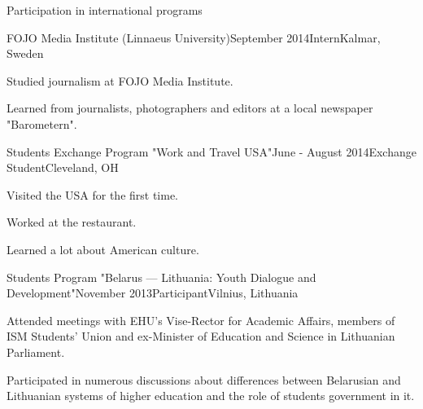 \documentclass{resume} %
\begin{document}

\begin{rSection}{Participation in international programs}
\begin{rSubsection}{FOJO Media Institute (Linnaeus University)}{September 2014}{Intern}{Kalmar, Sweden}
\item Studied journalism at FOJO Media Institute.
\item Learned from journalists, photographers and editors at a local newspaper "Barometern".
\end{rSubsection}

\begin{rSubsection}{Students Exchange Program "Work and Travel USA"}{June - August 2014}{Exchange Student}{Cleveland, OH}
\item Visited the USA for the first time.
\item Worked at the restaurant.
\item Learned a lot about American culture.
\end{rSubsection}

\begin{rSubsection}{Students Program "Belarus — Lithuania: Youth Dialogue and Development"}{November 2013}{Participant}{Vilnius, Lithuania}
\item Attended meetings with EHU's Vise-Rector for Academic Affairs, members of ISM Students' Union and ex-Minister of Education and Science in Lithuanian Parliament.
\item Participated in numerous discussions about differences between Belarusian and Lithuanian systems of higher education and the role of students government in it.
\end{rSubsection}

\end{rSection}
\end{document}
